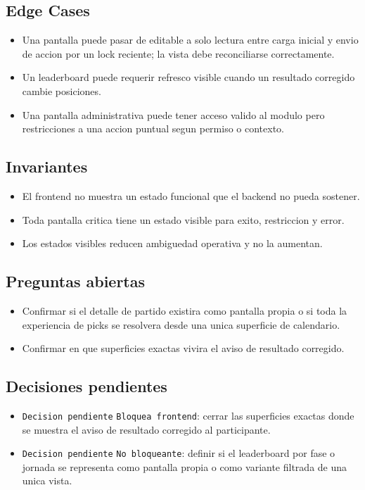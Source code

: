 \subsection{Edge Cases}

\begin{itemize}
  \item Una pantalla puede pasar de editable a solo lectura entre carga inicial y envio de accion por un lock reciente; la vista debe reconciliarse correctamente.
  \item Un leaderboard puede requerir refresco visible cuando un resultado corregido cambie posiciones.
  \item Una pantalla administrativa puede tener acceso valido al modulo pero restricciones a una accion puntual segun permiso o contexto.
\end{itemize}

\subsection{Invariantes}

\begin{itemize}
  \item El frontend no muestra un estado funcional que el backend no pueda sostener.
  \item Toda pantalla critica tiene un estado visible para exito, restriccion y error.
  \item Los estados visibles reducen ambiguedad operativa y no la aumentan.
\end{itemize}

\subsection{Preguntas abiertas}

\begin{itemize}
  \item Confirmar si el detalle de partido existira como pantalla propia o si toda la experiencia de picks se resolvera desde una unica superficie de calendario.
  \item Confirmar en que superficies exactas vivira el aviso de resultado corregido.
\end{itemize}

\subsection{Decisiones pendientes}

\begin{itemize}
  \item \texttt{Decision pendiente} \texttt{Bloquea frontend}: cerrar las superficies exactas donde se muestra el aviso de resultado corregido al participante.
  \item \texttt{Decision pendiente} \texttt{No bloqueante}: definir si el leaderboard por fase o jornada se representa como pantalla propia o como variante filtrada de una unica vista.
\end{itemize}
